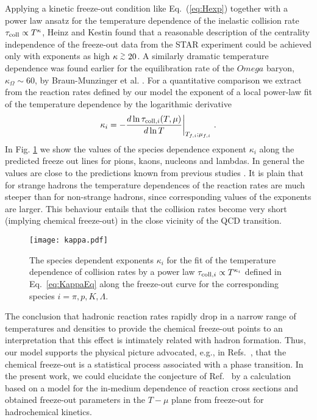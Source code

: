 \documentclass[12pt]{article}
\begin{document}
Applying a kinetic freeze-out condition like Eq.~(\ref{eq:Hexp}) together with a power law ansatz for the 
temperature dependence of the inelastic collision rate $\tau_{{\rm coll}}\propto T^{\kappa}$,
Heinz and Kestin  \cite{Heinz:2006ur} found that a reasonable description of the centrality independence
of the freeze-out data from the STAR experiment \cite{Adams:2003xp} could be achieved only with 
exponents as high $\kappa\gsim 20$.  
A similarly dramatic temperature dependence was found earlier for the equilibration rate of the 
$Omega$ baryon, $\kappa_\Omega \sim 60$, by Braun-Munzinger et al. \cite{BraunMunzinger:2003zz}.
For a quantitative comparison we extract from the reaction rates defined by our model the 
exponent of a local power-law fit of the temperature dependence by the logarithmic derivative
%
\begin{equation}
\kappa_i = - \frac{d \ln \tau_{{\rm coll},i}(T,\mu)}{d\ln T}\bigg|_{T_{f,i};\mu_{f,i}}~.
\label{eq:KappaEq}
\end{equation}
%
In Fig. \ref{fig:kappa} we show the values of the species dependence exponent $\kappa_i$
along the predicted freeze out lines for pions, kaons, nucleons and lambdas. 
In general the values are close to the predictions known from previous studies 
\cite{Heinz:2006ur,BraunMunzinger:2003zz}.
It is plain that for strange hadrons the temperature dependences of the reaction rates are much steeper than for non-strange hadrons, since corresponding values of the exponents are larger. 
This behaviour entails that the collision rates become very short (implying chemical freeze-out) in the close vicinity of the QCD transition. 



\begin{figure}[h]
	\begin{center}
	\texttt{[image: kappa.pdf]}
	\caption{The species dependent exponents $\kappa_i$ for the fit of the temperature dependence of  
	collision rates by a power law $\tau_{{\rm coll},i} \propto T^{\kappa_i}$ defined in 
	Eq.~\ref{eq:KappaEq} along the freeze-out curve for the corresponding species $i=\pi,p,K,\Lambda$.} 
	\label{fig:kappa}
	\end{center}
\end{figure}


The conclusion that hadronic reaction rates rapidly drop in a narrow range of temperatures and densities
to provide the chemical freeze-out points to an interpretation that this effect
is intimately related with hadron formation.
Thus, our model supports the physical picture advocated, e.g., in Refs.~\cite{Becattini:1997rv,Heinz:2006ur}, that the chemical freeze-out is a statistical process associated with a phase transition. 
In the present work, we could elucidate the conjecture of Ref.~\cite{Becattini:1997rv} by a calculation based on a model for the in-medium dependence of reaction cross sections and obtained freeze-out parameters in the $T-\mu$ plane from freeze-out for hadrochemical kinetics. 
\end{document}
